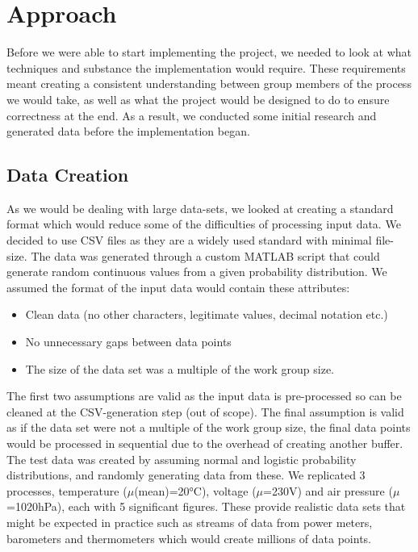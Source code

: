 
\section{Approach}


Before we were able to start implementing the project, we needed to look at what techniques and substance the implementation would require. These requirements meant creating a consistent understanding between group members of the process we would take, as well as what the project would be designed to do to ensure correctness at the end. As a result, we conducted some initial research and generated data before the implementation began.

\subsection{Data Creation}

As we would be dealing with large data-sets, we looked at creating a standard format which would reduce some of the difficulties of processing input data. We decided to use CSV files as they are a widely used standard with minimal file-size. The data was generated through a custom MATLAB script that could generate random continuous values from a given probability distribution. We assumed the format of the input data would contain these attributes:
\begin{itemize}
    \setlength\itemsep{0pt}
    \item Clean data (no other characters, legitimate values, decimal notation etc.)
    \item No unnecessary gaps between data points
    \item The size of the data set was a multiple of the work group size.
\end{itemize}
The first two assumptions are valid as the input data is pre-processed so can be cleaned at the CSV-generation step (out of scope). The final assumption is valid as if the data set were not a multiple of the work group size, the final data points would be processed in sequential due to the overhead of creating another buffer. The test data was created by assuming normal and logistic probability distributions, and randomly generating data from these. We replicated 3 processes, temperature ($\mu$(mean)=20°C), voltage ($\mu$=230V) and air pressure ($\mu$=1020hPa), each with 5 significant figures. These provide realistic data sets that might be expected in practice such as streams of data from power meters, barometers and thermometers which would create millions of data points.

